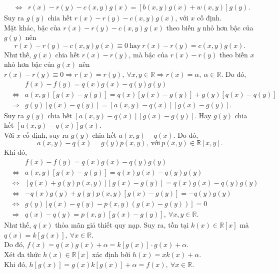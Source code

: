 \begin{bt}
{\begin{eqnarray*}
	&\Leftrightarrow & r(x)-r(y)-c(x, y)g(x)=\left[b(x, y)g(x)+w(x, y)\right]g(y).
\end{eqnarray*}
Suy ra $ g(y) $ chia hết $ r(x)-r(y)-c(x, y)g(x) $, với $ x $ cố định.\\
Mặt khác, bậc của $ r(x)-r(y)-c(x, y)g(x) $ theo biến $ y $ nhỏ hơn bậc của $ g(y) $ nên $$ r(x)-r(y)-c(x, y)g(x)\equiv 0 \ \text{hay}\  r(x)-r(y)=c(x, y)g(x).$$
Như thế, $ g(x) $ chia hết $ r(x)-r(y) $, mà bậc của $ r(x)-r(y) $ theo biến $ x $ nhỏ hơn bậc của $ g(x) $ nên $ r(x)-r(y)\equiv 0\Rightarrow r(x)=r(y),\ \forall x, y\in\mathbb{R}\Rightarrow r(x)=\alpha,\ \alpha\in\mathbb{R} $. Do đó,
\begin{eqnarray*}
	&& f(x)-f(y)= q(x)g(x)-q(y)g(y)\\
	&\Leftrightarrow & a(x, y)\left[g(x)-g(y)\right]=q(x)\left[g(x)-g(y)\right]+g(y)\left[q(x)-q(y)\right]\\
	&\Rightarrow & g(y)\left[q(x)-q(y)\right]=\left[a(x, y)-q(x)\right]\left[g(x)-g(y)\right].
\end{eqnarray*}
Suy ra $ g(y) $ chia hết $ \left[a(x, y)-q(x)\right]\left[g(x)-g(y)\right] $. Hay $ g(y) $ chia hết $ \left[a(x, y)-q(x)\right]g(x)$.\\
Với $ x $ cố định, suy ra $ g(y) $ chia hết $ a(x, y)-q(x) $. Do đó, $$ a(x, y)-q(x)=g(y)p(x, y),\  \text{với}\  p(x, y)\in\mathbb{R}[x, y]. $$
Khi đó, \begin{eqnarray*}
	&& f(x)-f(y)= q(x)g(x)-q(y)g(y)\\
	&\Leftrightarrow & a(x, y)\left[g(x)-g(y)\right]=q(x)g(x)-q(y)g(y)\\
	&\Leftrightarrow & \left[q(x)+g(y)p(x, y)\right]\left[g(x)-g(y)\right]=q(x)g(x)-q(y)g(y)\\
	&\Leftrightarrow & -q(x)g(y)+g(y)p(x, y)\left[g(x)-g(y)\right]=-q(y)g(y)\\
	&\Leftrightarrow & g(y)\left[q(x)-q(y)-p(x, y)\left(g(x)-g(y)\right)\right]=0\\
	&\Rightarrow & q(x)-q(y)=p(x, y)\left[g(x)-g(y)\right],\ \forall x, y\in\mathbb{R}.
\end{eqnarray*}
Như thế, $ q(x) $ thỏa mãn giả thiết quy nạp. Suy ra, tồn tại $ k(x)\in\mathbb{R}[x] $ mà $ q(x)=k\left[g(x)\right],\ \forall x\in\mathbb{R} $.\\
Do đó, $ f(x)=q(x)g(x)+\alpha=k\left[g(x)\right]\cdot g(x)+\alpha $.\\
Xét đa thức $ h(x)\in\mathbb{R}[x] $ xác định bởi $ h(x)=xk(x)+\alpha $.\\
Khi đó, $ h\left[g(x)\right]=g(x)k\left[g(x)\right]+\alpha=f(x),\ \forall x\in\mathbb{R} $.
}
\end{bt}

